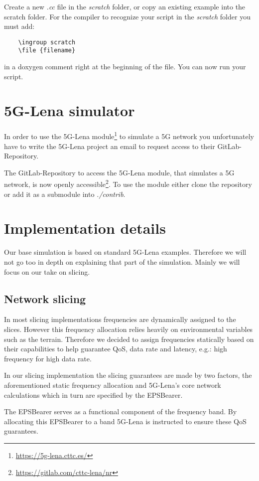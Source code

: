Create a new \textit{.cc} file in the \textit{scratch} folder, or copy an existing example into the scratch folder. For the compiler to recognize your script in the \textit{scratch} folder you must add: \begin{verbatim}
    \ingroup scratch
    \file {filename}
\end{verbatim} in a doxygen comment right at the beginning of the file. You can now run your script.

\section{5G-Lena simulator}
In order to use the 5G-Lena module\footnote[5]{\url{https://5g-lena.cttc.es/}} to simulate a 5G network you unfortunately have to write the 5G-Lena project an email to request access to their GitLab-Repository.

The GitLab-Repository to access the 5G-Lena module, that simulates a 5G network, is now openly accessible\footnote[6]{\url{https://gitlab.com/cttc-lena/nr}}.
To use the module either clone the repository or add it as a submodule into \textit{./contrib}.

\section{Implementation details}
    Our base simulation is based on standard 5G-Lena examples. Therefore we will not go too in depth on explaining that part of the simulation.
    Mainly we will focus on our take on slicing.
    
    \subsection{Network slicing}
    In most slicing implementations frequencies are dynamically assigned to the slices. However this frequency allocation relies heavily on environmental variables such as the terrain. Therefore we decided to assign frequencies statically based on their capabilities to help guarantee QoS, data rate and latency, e.g.: high frequency for high data rate.
    
    In our slicing implementation the slicing guarantees are made by two factors, the aforementioned static frequency allocation and 5G-Lena's core network calculations which in turn are specified by the EPSBearer. 
    
    The EPSBearer serves as a functional component of the frequency band. By allocating this EPSBearer to a band 5G-Lena is instructed to ensure these QoS guarantees.
    
